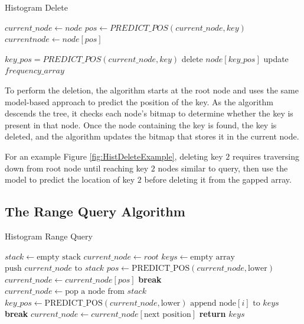 \begin{algorithm}
\caption{Histogram Delete}
\begin{algorithmic}[1]

\State $current\_node \gets node$
\State $pos \gets PREDICT\_POS(current\_node, key)$
    \State $current node \gets node[pos]$
    
\Else
    \State $key\_pos = PREDICT\_POS(current\_node, key)$
    \State delete $node[key\_pos]$
    \State update $frequency\_array$
\EndIf
\EndWhile
\EndProcedure
\end{algorithmic}
\end{algorithm}
To perform the deletion, the algorithm starts at the root node and uses the same model-based approach to predict the position of the key. As the algorithm descends the tree, it checks each node's bitmap to determine whether the key is present in that node. Once the node containing the key is found, the key is deleted, and the algorithm updates the bitmap that stores it in the current node.

For an example Figure \ref{fig:HistDeleteExample}, deleting key $2$ requires traversing down from root node until reaching key $2$ nodes similar to query, then use the model to predict the location of key $2$ before deleting it from the gapped array.  

\subsection{The Range Query Algorithm}
\begin{algorithm}
\caption{Histogram Range Query}
\begin{algorithmic}[1]

  \State $stack \gets \text{empty stack}$
  \State $current\_node \gets root$
  \State $keys \gets \text{empty array}$
      \State $\text{push } current\_node \text{ to } stack$
      \State $pos \gets \text{PREDICT\_POS}(current\_node, \text{lower})$
        \State $current\_node \gets current\_node[pos]$
      \Else
        \State \textbf{break}
      \EndIf
    \EndWhile
      \State $current\_node \gets \text{pop a node from } stack$
      \State $key\_pos \gets \text{PREDICT\_POS}(current\_node, \text{lower})$
          \State $\text{append } \text{node}[i] \text{ to } keys$
        \Else
          \State \textbf{break}
        \EndIf
      \EndFor
      \State $current\_node \gets current\_node[\text{next position}]$
    \EndIf
  \EndWhile
  \State \textbf{return} $keys$
\EndProcedure
\end{algorithmic}
\end{algorithm}


